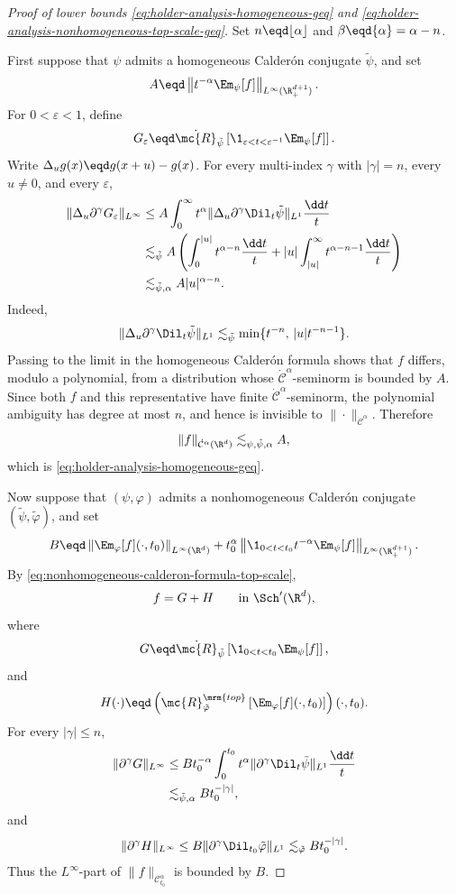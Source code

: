 \begin{proof}[Proof of lower bounds \eqref{eq:holder-analysis-homogeneous-geq} and \eqref{eq:holder-analysis-nonhomogeneous-top-scale-geq}] Set \(n\eqd\lfloor\alpha\rfloor\) and \(\beta\eqd\{\alpha\}=\alpha-n\).

First suppose that \(\psi\) admits a homogeneous Calder\'on conjugate \(\tilde{\psi}\), and set
\[
A\eqd
\left\|t^{-\alpha}\Em_\psi[f]\right\|_{L^\infty(\R^{d+1}_+)}.
\]
For \(0<\varepsilon<1\), define
\[
G_\varepsilon
\eqd
\dot{\mc{R}}_{\tilde{\psi}}
\left[\1_{\varepsilon<t<\varepsilon^{-1}}\Em_\psi[f]\right].
\]
Write \(\Delta_u g(x)\eqd g(x+u)-g(x)\).
For every multi-index \(\gamma\) with \(|\gamma|=n\), every \(u\neq0\), and every \(\varepsilon\),
\[
\begin{aligned}
  \|\Delta_u\partial^\gamma G_\varepsilon\|_{L^\infty}
   & \le
  A
  \int_0^\infty
  t^\alpha
  \|\Delta_u\partial^\gamma\Dil_t\tilde{\psi}\|_{L^1}
  \frac{\dd t}{t}
  \\
   & \lesssim_{\tilde{\psi}}
  A
  \left(
  \int_0^{|u|} t^{\alpha-n}\frac{\dd t}{t}
  +
  |u|\int_{|u|}^{\infty} t^{\alpha-n-1}\frac{\dd t}{t}
  \right)
  \\
   & \lesssim_{\tilde{\psi},\alpha}
  A |u|^{\alpha-n}.
\end{aligned}
\]
Indeed,
\[
\|\Delta_u\partial^\gamma\Dil_t\tilde{\psi}\|_{L^1}
\lesssim_{\tilde{\psi}}
\min\{t^{-n},\, |u|t^{-n-1}\}.
\]
Passing to the limit in the homogeneous Calder\'on formula shows that \(f\) differs, modulo a polynomial, from a distribution whose \(\dot{\mathcal{C}}^\alpha\)-seminorm is bounded by \(A\).
Since both \(f\) and this representative have finite \(\dot{\mathcal{C}}^\alpha\)-seminorm, the polynomial ambiguity has degree at most \(n\), and hence is invisible to \(\|\cdot\|_{\dot{\mathcal{C}}^\alpha}\).
Therefore
\[
\|f\|_{\dot{\mathcal{C}}^\alpha(\R^d)}
\lesssim_{\psi,\tilde{\psi},\alpha}
A,
\]
which is \eqref{eq:holder-analysis-homogeneous-geq}.

Now suppose that \((\psi,\varphi)\) admits a nonhomogeneous Calder\'on conjugate \((\tilde{\psi},\tilde{\varphi})\), and set
\[
B\eqd
\left\|\Em_\varphi[f](\cdot,t_0)\right\|_{L^\infty(\R^d)}
+
t_0^\alpha
\left\|
\1_{0<t<t_0}t^{-\alpha}\Em_\psi[f]
\right\|_{L^\infty(\R^{d+1}_+)}.
\]
By \eqref{eq:nonhomogeneous-calderon-formula-top-scale},
\[
f=G+H
\qquad \text{in } \Sch'(\R^d),
\]
where
\[
G
\eqd
\dot{\mc{R}}_{\tilde{\psi}}
\left[\1_{0<t<t_0}\Em_\psi[f]\right],
\]
and
\[
H(\cdot)
\eqd
\left(
\mc{R}^{\mrm{top}}_{\tilde{\varphi}}
\left[\Em_\varphi[f](\cdot,t_0)\right]
\right)(\cdot,t_0).
\]
For every \(|\gamma|\le n\),
\[
\begin{aligned}
  \|\partial^\gamma G\|_{L^\infty}
   & \le
  B t_0^{-\alpha}
  \int_0^{t_0}
  t^\alpha
  \|\partial^\gamma\Dil_t\tilde{\psi}\|_{L^1}
  \frac{\dd t}{t}
  \\
   & \lesssim_{\tilde{\psi},\alpha}
  B t_0^{-|\gamma|},
\end{aligned}
\]
and
\[
\|\partial^\gamma H\|_{L^\infty}
\le
B\|\partial^\gamma\Dil_{t_0}\tilde{\varphi}\|_{L^1}
\lesssim_{\tilde{\varphi}}
B t_0^{-|\gamma|}.
\]
Thus the \(L^\infty\)-part of \(\|f\|_{\mathcal{C}^\alpha_{t_0}}\) is bounded by \(B\).


\end{proof}
